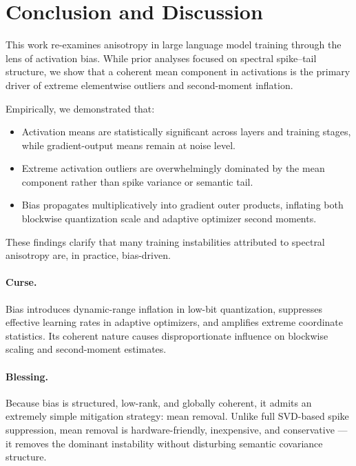 \section{Conclusion and Discussion}
\label{sec:conclusion}

This work re-examines anisotropy in large language model training
through the lens of activation bias.
While prior analyses focused on spectral spike--tail structure,
we show that a coherent mean component in activations
is the primary driver of extreme elementwise outliers
and second-moment inflation.

Empirically, we demonstrated that:

\begin{itemize}
    \item Activation means are statistically significant across layers and
    training stages, while gradient-output means remain at noise level.
    \item Extreme activation outliers are overwhelmingly dominated by
    the mean component rather than spike variance or semantic tail.
    \item Bias propagates multiplicatively into gradient outer products,
    inflating both blockwise quantization scale and adaptive optimizer
    second moments.
\end{itemize}

These findings clarify that many training instabilities attributed to
spectral anisotropy are, in practice, bias-driven.

\paragraph{Curse.}
Bias introduces dynamic-range inflation in low-bit quantization,
suppresses effective learning rates in adaptive optimizers,
and amplifies extreme coordinate statistics.
Its coherent nature causes disproportionate influence on
blockwise scaling and second-moment estimates.

\paragraph{Blessing.}
Because bias is structured, low-rank, and globally coherent,
it admits an extremely simple mitigation strategy:
mean removal.
Unlike full SVD-based spike suppression,
mean removal is hardware-friendly, inexpensive,
and conservative — it removes the dominant instability
without disturbing semantic covariance structure.


